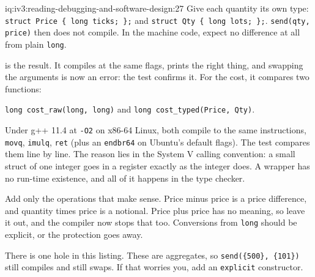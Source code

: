 \begin{solution}{iq:iv3:reading-debugging-and-software-design:27}
Give each quantity its own type: \texttt{struct Price \{ long ticks; \};} and \texttt{struct Qty \{ long lots; \};}. \texttt{send(qty, price)} then does not compile. In the machine code, expect no difference at all from plain \texttt{long}.

 is the result. It compiles at the same flags, prints the right thing, and swapping the arguments is now an error: the test confirms it. For the cost, it compares two functions:

\texttt{long cost\_raw(long, long)} and \texttt{long cost\_typed(Price, Qty)}.

Under g++ 11.4 at \texttt{-O2} on x86-64 Linux, both compile to the same instructions, \texttt{movq}, \texttt{imulq}, \texttt{ret} (plus an \texttt{endbr64} on Ubuntu's default flags). The test compares them line by line. The reason lies in the System V calling convention: a small struct of one integer goes in a register exactly as the integer does. A wrapper has no run-time existence, and all of it happens in the type checker.

Add only the operations that make sense. Price minus price is a price difference, and quantity times price is a notional. Price plus price has no meaning, so leave it out, and the compiler now stops that too. Conversions from \texttt{long} should be explicit, or the protection goes away.

There is one hole in this listing. These are aggregates, so \texttt{send(\{500\}, \{101\})} still compiles and still swaps. If that worries you, add an \texttt{explicit} constructor.

\label{lst:iv3:rd:strong}


\end{solution}

